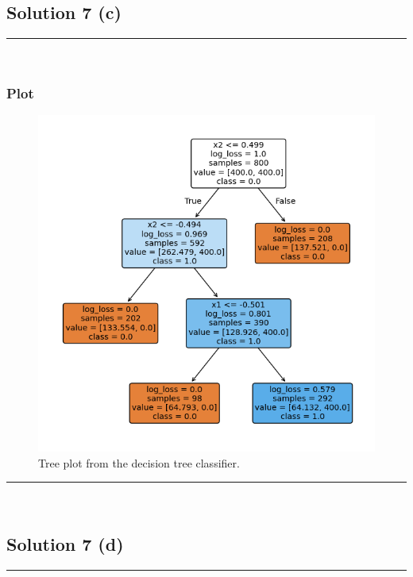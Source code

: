 \documentclass{article}
\begin{document}
\subsection*{Solution 7 (c)}
\noindent\rule{\textwidth}{0.4pt}\\

\subsubsection*{Plot}
\begin{figure}[H]
  \includegraphics{hw9_q7c.png}
  \caption{Tree plot from the decision tree classifier.}
\end{figure}

\noindent\rule{\textwidth}{0.4pt}\\

\newpage

\subsection*{Solution 7 (d)}
\noindent\rule{\textwidth}{0.4pt}\\
\end{document}

